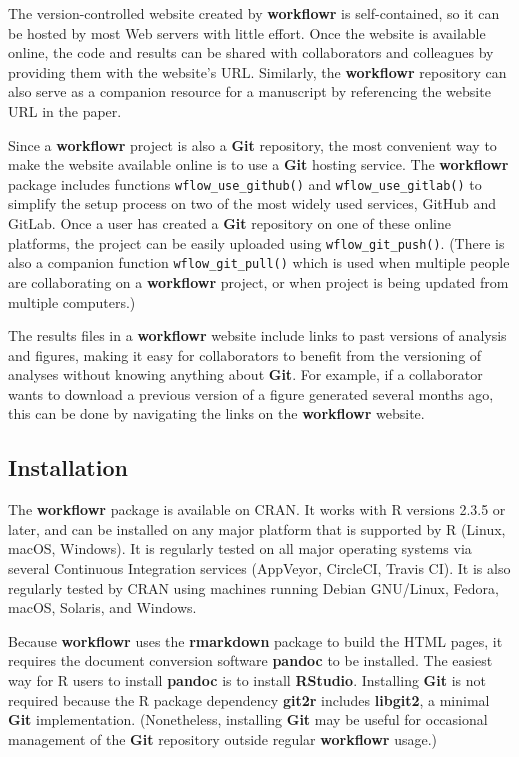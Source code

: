 \documentclass[9pt,a4paper]{extarticle}
\begin{document}
The version-controlled website created by \textbf{workflowr} is self-contained,
so it can be hosted by most Web servers with little effort. Once the
website is available online, the code and results can be shared with
collaborators and colleagues by providing them with the website's URL.
Similarly, the \textbf{workflowr} repository can also serve as a companion
resource for a manuscript by referencing the website URL in the paper.

Since a \textbf{workflowr} project is also a \textbf{Git} repository, the most convenient
way to make the website available online is to use a \textbf{Git} hosting
service. The \textbf{workflowr} package includes functions \texttt{wflow\_use\_github()} and
\texttt{wflow\_use\_gitlab()} to simplify the setup process on two of the most
widely used services, GitHub and GitLab. Once a user has created a \textbf{Git}
repository on one of these online platforms, the project can be easily
uploaded using \texttt{wflow\_git\_push()}. (There is also a companion function
\texttt{wflow\_git\_pull()} which is used when multiple people are collaborating on
a \textbf{workflowr} project, or when project is being updated from multiple
computers.)

The results files in a \textbf{workflowr} website include links to past versions
of analysis and figures, making it easy for collaborators to benefit
from the versioning of analyses without knowing anything about \textbf{Git}. For
example, if a collaborator wants to download a previous version of a
figure generated several months ago, this can be done by navigating the
links on the \textbf{workflowr} website.

\subsection*{Installation}

The \textbf{workflowr} package is available on CRAN. It works with R versions
2.3.5 or later, and can be installed on any major platform that is
supported by R (Linux, macOS, Windows). It is regularly tested on all
major operating systems via several Continuous Integration services
(AppVeyor, CircleCI, Travis CI). It is also regularly tested by CRAN
using machines running Debian GNU/Linux, Fedora, macOS, Solaris, and
Windows.

Because \textbf{workflowr} uses the \textbf{rmarkdown} package to build the HTML pages, it
requires the document conversion software \textbf{pandoc} to be installed. The
easiest way for R users to install \textbf{pandoc} is to install \textbf{RStudio}.
Installing \textbf{Git} is not required because the R package dependency \textbf{git2r}
includes \textbf{libgit2}, a minimal \textbf{Git} implementation. (Nonetheless, installing
 \textbf{Git} may be useful for occasional management of the \textbf{Git} repository
outside regular \textbf{workflowr} usage.)
\end{document}
